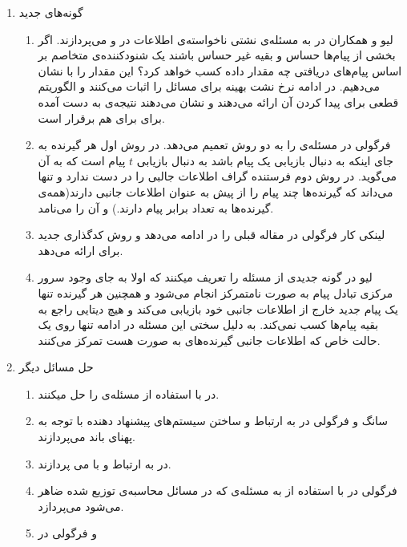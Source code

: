 \begin{enumerate}
	\item گونه‌های جدید
	\begin{enumerate}
		\item 
		لیو و همکاران در
		\cite{10015670}
		به مسئله‌ی نشتی ناخواسته‌ی اطلاعات در 
		\icod
		و
		\picod
		می‌پردازند. اگر بخشی از پیام‌ها حساس و بقیه غیر حساس باشند یک شنودکننده‌ی متخاصم بر اساس پیام‌های دریافتی چه مقدار داده کسب خواهد کرد؟ این مقدار را با
		نشان می‌دهیم. در ادامه نرخ نشت بهینه برای مسائل
		\icod
		را اثبات می‌کنند و الگوریتم قطعی برای پیدا کردن آن ارائه می‌دهند و نشان می‌دهند نتیجه‌ی به دست آمده برای
		\icod
		برای
		\picod
		هم برقرار است.
		\item 
		فرگولی در
		\cite{6620405}
		مسئله‌ی
		\picod
		را به دو روش تعمیم می‌دهد. در روش اول هر گیرنده به جای اینکه به دنبال بازیابی یک پیام باشد به دنبال بازیابی
		$t$
		پیام است که به آن
		می‌گوید.
		در روش دوم فرستنده گراف اطلاعات جالبی را در دست ندارد و تنها می‌داند که گیرنده‌ها چند پیام را از پیش به عنوان اطلاعات جانبی دارند(همه‌ی گیرنده‌ها به تعداد برابر پیام دارند.) و آن را
		می‌نامد.
		\item 
		لینکی کار فرگولی در مقاله قبلی را در
		\cite{8625330}
		ادامه می‌دهد و روش کدگذاری جدید برای 
		ارائه می‌دهد.
		\item 
		لیو در
		\cite{9173957}
		گونه جدیدی از مسئله را تعریف میکنند که اولا به جای وجود سرور مرکزی تبادل پیام به صورت نامتمرکز انجام می‌شود  و همچنین هر گیرنده تنها یک پیام جدید خارج از اطلاعات جانبی خود بازیابی می‌کند و هیچ دیتایی راجع به بقیه پیام‌ها کسب نمی‌کند. به دلیل سختی این مسئله در ادامه تنها روی یک حالت خاص که اطلاعات جانبی گیرنده‌های به صورت
		هست تمرکز می‌کنند.	

	\end{enumerate}
	\item حل مسائل دیگر
		\begin{enumerate}
			\item 
	در
	\cite{Obead_2023}
	با استفاده از  
	\picod
	مسئله‌ی
	را حل میکنند.
			\item
	سانگ و فرگولی در
	\cite{8404065}
	به ارتباط 
	\picod
	و ساختن  سیستم‌های پیشنهاد دهنده‌ با توجه به پهنای باند می‌پردازند.
	\item
	در
	\cite{e24081149}
	به ارتباط 
	\icod
	و
	\picod
	با
		می پردازند.
		\item 
		فرگولی در
		\cite{datashuf}
		با استفاده از
		\picod
		به مسئله‌ی
		که در مسائل محاسبه‌ی توزیع شده ضاهر می‌شود می‌پردازد.
	\item
	و فرگولی در
	

\end{enumerate}
\end{enumerate}
